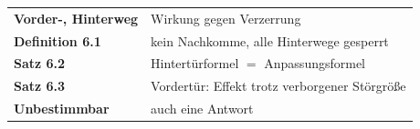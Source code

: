 \begin{merksatz}
\begin{center}
\renewcommand{\arraystretch}{1.5}
\begin{tabular}{@{}P{3.0cm}P{5.6cm}@{}}
\toprule
\textbf{Vorder-, Hinterweg} & Wirkung gegen Verzerrung\\
\textbf{Definition 6.1} & kein Nachkomme, alle Hinterwege gesperrt\\
\textbf{Satz 6.2} & Hintertürformel $=$ Anpassungsformel\\
\textbf{Satz 6.3} & Vordertür: Effekt trotz verborgener Störgröße\\
\textbf{Unbestimmbar} & auch eine Antwort\\
\bottomrule
\end{tabular}
\end{center}

\begin{center}
\begin{minipage}{0.88\textwidth}
\end{minipage}
\end{center}
\end{merksatz}
